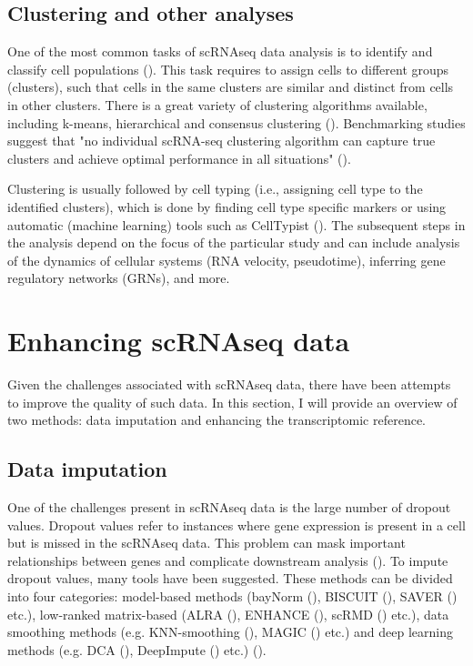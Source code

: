 \subsection{Clustering and other analyses}

One of the most common tasks of scRNAseq data analysis is to identify and classify cell populations (\cite{Andrews2018}).
This task requires to assign cells to different groups (clusters),
such that cells in the same clusters are similar and distinct from cells in other clusters.
There is a great variety of clustering algorithms available,
including k-means, hierarchical and consensus clustering (\cite{Peng2020}).
Benchmarking studies suggest that "no individual scRNA-seq clustering algorithm can capture true clusters and achieve
optimal performance in all situations" (\cite{Peng2020}).

Clustering is usually followed by cell typing (i.e., assigning cell type to the identified clusters),
which is done by finding cell type specific markers
or using automatic (machine learning) tools such as CellTypist (\cite{Dom2022}).
The subsequent steps in the analysis depend on the focus of the particular study and can include
analysis of the dynamics of cellular systems (RNA velocity, pseudotime),
inferring gene regulatory networks (GRNs), and more.

\section{Enhancing scRNAseq data}

Given the challenges associated with scRNAseq data, there have been attempts to improve the quality of such data.
In this section, I will provide an overview of two methods: data imputation and enhancing the transcriptomic reference.

\subsection{Data imputation}
\label{sec:imputation}

One of the challenges present in scRNAseq data is the large number of dropout values.
Dropout values refer to instances where gene expression is present in a cell but is missed in the scRNAseq data.
This problem can mask important relationships between genes and complicate downstream analysis (\cite{Wang2022}).
To impute dropout values, many tools have been suggested.
These methods can be divided into four categories:
model-based methods (bayNorm (\cite{Tang2019}), BISCUIT (\cite{Azizi2017}), SAVER (\cite{Huang2018}) etc.),
low-ranked matrix-based (ALRA (\cite{Linderman2022}), ENHANCE (\cite{Wagner2019}), scRMD (\cite{Chen2020}) etc.),
data smoothing methods (e.g. KNN-smoothing (\cite{Wagner2017}), MAGIC (\cite{Dijk2018}) etc.) and
deep learning methods (e.g. DCA (\cite{Eraslan2019}), DeepImpute (\cite{Arisdakessian2019}) etc.) (\cite{Wang2022}).

